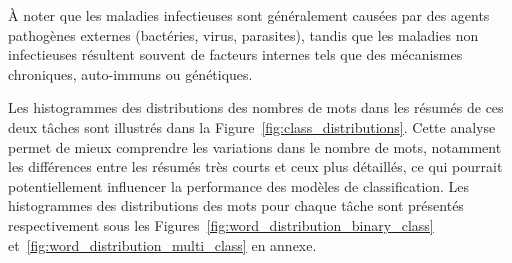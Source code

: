 \documentclass[12pt]{report}
\begin{document}
À noter que les maladies infectieuses sont généralement causées par des agents pathogènes externes (bactéries, virus, parasites), tandis que les maladies non infectieuses résultent souvent de facteurs internes tels que des mécanismes chroniques, auto-immuns ou génétiques.

Les histogrammes des distributions des nombres de mots dans les résumés de ces deux tâches sont illustrés dans la Figure~\ref{fig:class_distributions}. Cette analyse permet de mieux comprendre les variations dans le nombre de mots, notamment les différences entre les résumés très courts et ceux plus détaillés, ce qui pourrait potentiellement influencer la performance des modèles de classification. Les histogrammes des distributions des mots pour chaque tâche sont présentés respectivement sous les Figures~\ref{fig:word_distribution_binary_class} et~\ref{fig:word_distribution_multi_class} en annexe.
\end{document}
